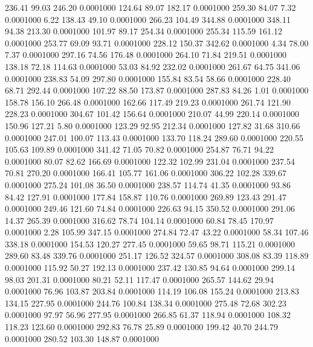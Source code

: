  236.41   99.03  246.20   0.0001000
 124.64   89.07  182.17   0.0001000
 259.30   84.07    7.32   0.0001000
   6.22  138.43   49.10   0.0001000
 266.23  104.49  344.88   0.0001000
 348.11   94.38  213.30   0.0001000
 101.97   89.17  254.34   0.0001000
 255.34  115.59  161.12   0.0001000
 253.77   69.09   93.71   0.0001000
 228.12  150.37  342.62   0.0001000
   4.34   78.00    7.37   0.0001000
 297.16   74.56  176.48   0.0001000
 264.10   71.84  219.51   0.0001000
 138.18   72.18  114.63   0.0001000
  53.03   84.92  232.02   0.0001000
 261.67   64.75  341.06   0.0001000
 238.83   54.09  297.80   0.0001000
 155.84   83.54   58.66   0.0001000
 228.40   68.71  292.44   0.0001000
 107.22   88.50  173.87   0.0001000
 287.83   84.26    1.01   0.0001000
 158.78  156.10  266.48   0.0001000
 162.66  117.49  219.23   0.0001000
 261.74  121.90  228.23   0.0001000
 304.67  101.42  156.64   0.0001000
 210.07   44.99  220.14   0.0001000
 150.96  127.21    5.80   0.0001000
 123.29   92.95  212.34   0.0001000
 127.82   31.68  310.66   0.0001000
 247.01  100.07  113.43   0.0001000
 133.70  118.24  289.60   0.0001000
 220.55  105.63  109.89   0.0001000
 341.42   71.05   70.82   0.0001000
 254.87   76.71   94.22   0.0001000
  80.07   82.62  166.69   0.0001000
 122.32  102.99  231.04   0.0001000
 237.54   70.81  270.20   0.0001000
 166.41  105.77  161.06   0.0001000
 306.22  102.28  339.67   0.0001000
 275.24  101.08   36.50   0.0001000
 238.57  114.74   41.35   0.0001000
  93.86   84.42  127.91   0.0001000
 177.84  158.87  110.76   0.0001000
 269.89  123.43  291.47   0.0001000
 249.46  121.60   74.84   0.0001000
 226.63   94.15  350.52   0.0001000
 291.06   14.37  265.39   0.0001000
 316.62   78.74  104.14   0.0001000
  60.84   78.45  170.97   0.0001000
   2.28  105.99  347.15   0.0001000
 274.84   72.47   43.22   0.0001000
  58.34  107.46  338.18   0.0001000
 154.53  120.27  277.45   0.0001000
  59.65   98.71  115.21   0.0001000
 289.60   83.48  339.76   0.0001000
 251.17  126.52  324.57   0.0001000
 308.08   83.39  118.89   0.0001000
 115.92   50.27  192.13   0.0001000
 237.42  130.85   94.64   0.0001000
 299.14   98.03  201.31   0.0001000
  80.21   52.11  117.47   0.0001000
 265.57  144.62   29.94   0.0001000
  76.96  103.87  203.84   0.0001000
 114.19  106.08  155.24   0.0001000
 213.83  134.15  227.95   0.0001000
 244.76  100.84  138.34   0.0001000
 275.48   72.68  302.23   0.0001000
  97.97   56.96  277.95   0.0001000
 266.85   61.37  118.94   0.0001000
 108.32  118.23  123.60   0.0001000
 292.83   76.78   25.89   0.0001000
 199.42   40.70  244.79   0.0001000
 280.52  103.30  148.87   0.0001000
